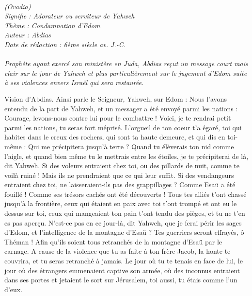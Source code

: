 \BFont
\noindent\hrulefill
{\footnotesize
\textit{
\bigskip
{\centering{}
\\(Ovadia)
\\Signifie : Adorateur ou serviteur de Yahweh
\\Thème : Condamnation d'Edom
\\Auteur : Abdias
\\Date de rédaction : 6ème siècle av. J.-C.\\}
}
\textit{
\\Prophète ayant exercé son ministère en Juda, Abdias reçut un message court mais clair sur le jour de Yahweh et plus particulièrement sur le jugement d’Edom suite à ses violences envers Israël qui sera restaurée.\bigskip
}
}
\par\nobreak\noindent\hrulefill
\begin{multicols}{2}
\VerseOne{}Vision d'Abdias. Ainsi parle le Seigneur, Yahweh, sur Edom : Nous l’avons entendu de la part de Yahweh, et un messager a été envoyé parmi les nations : Courage, levons-nous contre lui pour le combattre !
Voici, je te rendrai petit parmi les nations, tu seras fort méprisé.
L'orgueil de ton coeur t'a égaré, toi qui habites dans le creux des rochers, qui sont ta haute demeure, et qui dis en toi-même : Qui me précipitera jusqu’à terre ?
Quand tu élèverais ton nid comme l'aigle, et quand bien même tu le mettrais entre les étoiles, je te précipiterai de là, dit Yahweh.
Si des voleurs entraient chez toi, ou des pillards de nuit, comme te voilà ruiné ! Mais ils ne prendraient que ce qui leur suffit. Si des vendangeurs entraient chez toi, ne laisseraient-ils pas des grappillages ?
Comme Esaü a été fouillé ! Comme ses trésors cachés ont été découverts !
Tous tes alliés t'ont chassé jusqu'à la frontière, ceux qui étaient en paix avec toi t'ont trompé et ont eu le dessus sur toi, ceux qui mangeaient ton pain t'ont tendu des pièges, et tu ne t’en es pas aperçu.
N’est-ce pas en ce jour-là, dit Yahweh, que je ferai périr les sages d'Edom, et l’intelligence de la montagne d'Esaü ?
Tes guerriers seront effrayés, ô Théman ! Afin qu’ils soient tous retranchés de la montagne d'Esaü par le carnage.
A cause de la violence que tu as faite à ton frère Jacob, la honte te couvrira, et tu seras retranché à jamais.
Le jour où tu te tenais en face de lui, le jour où des étrangers emmenaient captive son armée, où des inconnus entraient dans ses portes et jetaient le sort sur Jérusalem, toi aussi, tu étais comme l'un d'eux.

\end{multicols}
